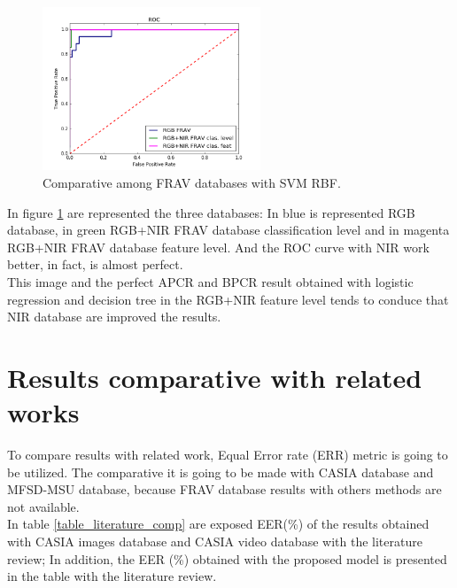 \begin{figure}[htb]
\centering
\includegraphics[width=0.58\textwidth]{images/comparative/FRAVs_SVM_RBF_ROC.png}
\caption{Comparative among FRAV databases with SVM RBF.} \label{fig:FRAVS_SVM_comparative}
\end{figure}

In figure \ref{fig:FRAVS_SVM_comparative} are represented the three databases: In blue is represented RGB database, in green RGB+NIR FRAV database classification level and in magenta RGB+NIR FRAV database feature level. And the ROC curve with NIR work better, in fact, is almost perfect.\\

This image and the perfect APCR and BPCR result obtained with logistic regression and decision tree in the RGB+NIR feature level tends to conduce that NIR database are improved the results.

\section{Results comparative with related works}
To compare results with related work, Equal Error rate (ERR) metric is going to be utilized. The comparative it is going to be made with CASIA database and MFSD-MSU database, because FRAV database results with others methods are not available.\\

In table \ref{table_literature_comp} are exposed EER(\%) of the results obtained with CASIA images database and CASIA video database with the literature review; In addition, the EER (\%) obtained with the proposed model is presented in the table with the literature review.\\

